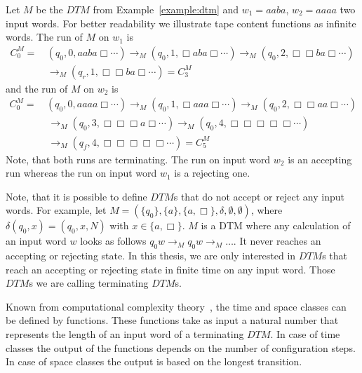 \begin{example}
    \label{example:run_of_dtm}
    Let $M$ be the $\mathit{DTM}$ from Example~\ref{example:dtm} and $w_1 = aaba$, $w_2 = aaaa$ two input words. For
    better readability we illustrate tape content functions as infinite words. The run of $M$ on $w_1$ is
    \begin{align*}
        C_0^M = &\,(q_0, 0, aaba\Box \dotsb) \rightarrow_M (q_0, 1, \Box aba\Box \dotsb) \rightarrow_M  (q_0, 2, \Box \Box
        ba\Box \dotsb)\\&\, \rightarrow_M (q_r, 1, \Box \Box ba\Box \dotsb) = C_3^M
    \end{align*}
    and the run of $M$ on $w_2$ is
    \begin{align*}
        C_0^M =\,&(q_0, 0, aaaa\Box \dotsb) \rightarrow_M (q_0, 1, \Box aaa\Box \dotsb) \rightarrow_M (q_0, 2, \Box \Box
        aa\Box \dotsb) \\&\,\rightarrow_M
        (q_0, 3, \Box \Box \Box a\Box \dotsb) \rightarrow_M (q_0, 4, \Box \Box \Box \Box \Box \dotsb) \\&\,\rightarrow_M
        (q_f, 4, \Box \Box \Box \Box \Box \dotsb) = C_5^M
    \end{align*}
    Note, that both runs are terminating. The run on input word $w_2$ is an accepting run whereas the run on input word $w_1$ is a rejecting one.
\end{example}

Note, that it is possible to define $\mathit{DTM}$s that do not accept or reject any input words. For example, let
$M = (\{q_0\}, \{a\}, \{a, \Box\}, \delta, \emptyset, \emptyset)$, where $\delta(q_0, x) = (q_0, x, N)$ with $x \in
\{a, \Box\}$. $M$ is a DTM where any calculation of an input word $w$ looks as follows $q_0w \rightarrow_M q_0w
\rightarrow_M \dots$. It never reaches an accepting or rejecting state. In this thesis, we are only interested in
$\mathit{DTM}$s that reach an accepting or rejecting state in finite time on any input word. Those $\mathit{DTM}$s
we are calling terminating $\mathit{DTM}$s.

Known from computational complexity theory~\cite{papadimitriou1994complexity}, the time and space classes
can be defined by functions. These functions take as input a natural number that represents the length of an input
word of a terminating $\mathit{DTM}$. In case of time classes the output of the functions depends on the number of
configuration steps. In case of space classes the output is based on the longest transition.

